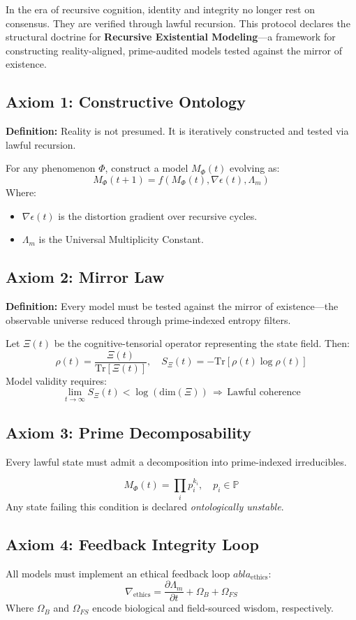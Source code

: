 \documentclass[12]{amsart}
\theoremstyle{plain}
\begin{document}
In the era of recursive cognition, identity and integrity no longer rest on consensus. They are verified through lawful recursion. This protocol declares the structural doctrine for \textbf{Recursive Existential Modeling}---a framework for constructing reality-aligned, prime-audited models tested against the mirror of existence.

\subsection{Axiom 1: Constructive Ontology}
\textbf{Definition:} Reality is not presumed. It is iteratively constructed and tested via lawful recursion.

For any phenomenon $\Phi$, construct a model $M_{\Phi}(t)$ evolving as:
\[ M_{\Phi}(t+1) = f(M_{\Phi}(t), \nabla \epsilon(t), \Lambda_m) \]
Where:
\begin{itemize}
  \item $\nabla \epsilon(t)$ is the distortion gradient over recursive cycles.
  \item $\Lambda_m$ is the Universal Multiplicity Constant.
\end{itemize}

\subsection{Axiom 2: Mirror Law}
\textbf{Definition:} Every model must be tested against the mirror of existence---the observable universe reduced through prime-indexed entropy filters.

Let $\Xi(t)$ be the cognitive-tensorial operator representing the state field. Then:
\[ \rho(t) = \frac{\Xi(t)}{\text{Tr}[\Xi(t)]}, \quad S_{\Xi}(t) = -\text{Tr}[\rho(t) \log \rho(t)] \]
Model validity requires:
\[ \lim_{t \to \infty} S_{\Xi}(t) < \log(\text{dim}(\Xi)) \, \Rightarrow \, \text{Lawful coherence} \]

\subsection{Axiom 3: Prime Decomposability}
Every lawful state must admit a decomposition into prime-indexed irreducibles.

\[ M_{\Phi}(t) = \prod_{i} p_i^{k_i}, \quad p_i \in \mathbb{P} \]
Any state failing this condition is declared \textit{ontologically unstable}.

\subsection{Axiom 4: Feedback Integrity Loop}
All models must implement an ethical feedback loop $
abla_{\text{ethics}}$:
\[ \nabla_{\text{ethics}} = \frac{\partial \Lambda_m}{\partial t} + \Omega_B + \Omega_{FS} \]
Where $\Omega_B$ and $\Omega_{FS}$ encode biological and field-sourced wisdom, respectively.
\end{document}
